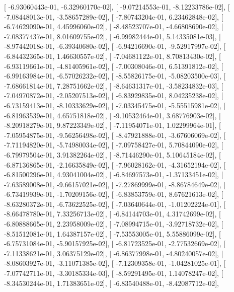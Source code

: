 \documentclass{article}
\begin{document}
       [ -6.93060443e-01,  -6.32960170e-02],
       [ -9.07214553e-01,  -8.12233786e-02],
       [ -7.08448013e-01,  -3.58657289e-02],
       [ -7.80743204e-01,   6.23462848e-02],
       [ -6.74629090e-01,   4.45996060e-02],
       [ -8.48523707e-01,  -4.66808690e-02],
       [ -7.08377437e-01,   8.01609755e-02],
       [ -6.99982444e-01,   5.14335081e-03],
       [ -8.97442018e-01,  -6.39340680e-02],
       [ -6.94216690e-01,  -9.52917997e-02],
       [ -6.84432365e-01,   1.46630557e-02],
       [ -7.04681122e-01,   8.70813430e-02],
       [ -6.93119661e-01,  -4.81405961e-02],
       [ -7.00308046e-01,   6.51391812e-02],
       [ -6.99163984e-01,  -6.57026232e-02],
       [ -8.55826175e-01,  -5.08203500e-03],
       [ -7.68661814e-01,   7.28751662e-02],
       [ -8.64631317e-01,  -3.58234832e-03],
       [ -7.04970872e-01,  -2.05207513e-02],
       [ -6.83929835e-01,   8.04235238e-02],
       [ -6.73159413e-01,  -8.10333629e-02],
       [ -7.03345475e-01,  -5.55515981e-02],
       [ -6.81963539e-01,   4.65751818e-02],
       [ -9.10532464e-01,   3.68776903e-02],
       [ -8.20918279e-01,   9.87223349e-02],
       [ -7.11954071e-01,   1.02299964e-01],
       [ -7.05954875e-01,  -9.56256498e-02],
       [ -8.47921888e-01,  -3.67606069e-02],
       [ -7.71194820e-01,  -5.74980034e-02],
       [ -7.09758427e-01,   5.70844090e-02],
       [ -6.79979504e-01,   3.91382264e-02],
       [ -8.71446290e-01,   5.10645184e-02],
       [ -6.87136865e-01,  -2.16635849e-02],
       [ -7.96028162e-01,  -4.31652194e-02],
       [ -6.81500296e-01,   4.93041004e-02],
       [ -6.84697573e-01,  -1.37133451e-02],
       [ -7.63589008e-01,  -9.66157021e-02],
       [ -7.27869999e-01,  -8.86784649e-02],
       [ -6.73419939e-01,  -1.70209156e-02],
       [ -6.83853759e-01,   8.67621613e-02],
       [ -8.63280372e-01,  -6.73622525e-02],
       [ -7.03640644e-01,  -1.01202224e-01],
       [ -8.66478780e-01,   7.33256713e-02],
       [ -6.84144703e-01,   4.31742699e-02],
       [ -6.80888665e-01,   2.23958009e-02],
       [ -7.08994715e-01,  -3.92718732e-02],
       [ -8.51512081e-01,   1.64387157e-02],
       [ -7.53553005e-01,   5.55886099e-02],
       [ -6.75731084e-01,  -5.90157925e-02],
       [ -6.81723525e-01,  -2.77532669e-02],
       [ -7.11338621e-01,   3.06375129e-02],
       [ -6.86377998e-01,  -4.80240057e-02],
       [ -8.08603927e-01,  -3.11071385e-02],
       [ -7.12309358e-01,  -1.04281025e-01],
       [ -7.07742711e-01,  -3.30185334e-03],
       [ -8.59291495e-01,   1.14078247e-02],
       [ -8.34530244e-01,   1.71383651e-02],
       [ -6.83540488e-01,  -8.42087712e-02],
\end{document}
